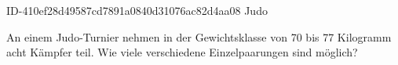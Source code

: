 \begin{exercise}
      {ID-410ef28d49587cd7891a0840d31076ac82d4aa08}
      {Judo}
  \ifproblem\problem\par
    An einem Judo-Turnier nehmen in der Gewichtsklasse von 70 bis 77 Kilogramm
    acht Kämpfer teil. Wie viele verschiedene Einzelpaarungen sind möglich?
  \fi
\end{exercise}
